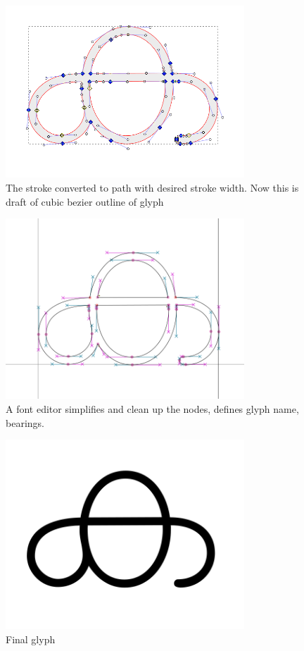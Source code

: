 \documentclass[10pt]{article}
\begin{document}
\begin{figure}[h!]
	\centering
	\includegraphics[width=0.8\textwidth]{images/design-2-stroke-to-path.png}
	\caption{The stroke converted to path with desired stroke width. Now this is draft of cubic bezier outline of glyph}
	\label{design-2}
\end{figure}

\begin{figure}[h!]
	\centering
	\includegraphics[width=0.8\textwidth]{images/design-3-cubic-bezier-in-font-editor.png}
	\caption{A font editor simplifies and clean up the nodes, defines glyph name, bearings.}
	\label{design-3}
\end{figure}

\begin{figure}[h!]
	\centering
	\includegraphics[width=0.8\textwidth]{images/design-4-final.png}
	\caption{Final glyph}
	\label{design-4}
\end{figure}
\end{document}
